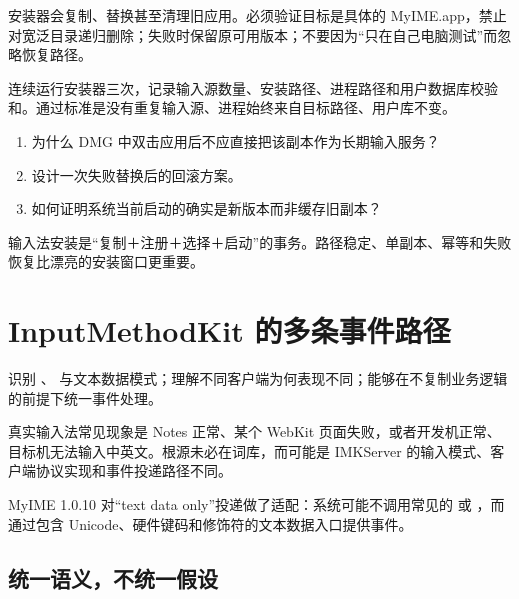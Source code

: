 \begin{warningbox}[安装器是高风险代码]
安装器会复制、替换甚至清理旧应用。必须验证目标是具体的 MyIME.app，禁止对宽泛目录递归删除；失败时保留原可用版本；不要因为“只在自己电脑测试”而忽略恢复路径。
\end{warningbox}

\begin{lab}[幂等性]
连续运行安装器三次，记录输入源数量、安装路径、进程路径和用户数据库校验和。通过标准是没有重复输入源、进程始终来自目标路径、用户库不变。
\end{lab}

\exercises
\begin{enumerate}
  \item 为什么 DMG 中双击应用后不应直接把该副本作为长期输入服务？
  \item 设计一次失败替换后的回滚方案。
  \item 如何证明系统当前启动的确实是新版本而非缓存旧副本？
\end{enumerate}

\begin{summarybox}
输入法安装是“复制＋注册＋选择＋启动”的事务。路径稳定、单副本、幂等和失败恢复比漂亮的安装窗口更重要。
\end{summarybox}


\chapter{InputMethodKit 的多条事件路径}

\begin{goals}
识别 、 与文本数据模式；理解不同客户端为何表现不同；能够在不复制业务逻辑的前提下统一事件处理。
\end{goals}

真实输入法常见现象是 Notes 正常、某个 WebKit 页面失败，或者开发机正常、目标机无法输入中英文。根源未必在词库，而可能是 IMKServer 的输入模式、客户端协议实现和事件投递路径不同。

MyIME 1.0.10 对“text data only”投递做了适配：系统可能不调用常见的  或 ，而通过包含 Unicode、硬件键码和修饰符的文本数据入口提供事件。



\section{统一语义，不统一假设}

